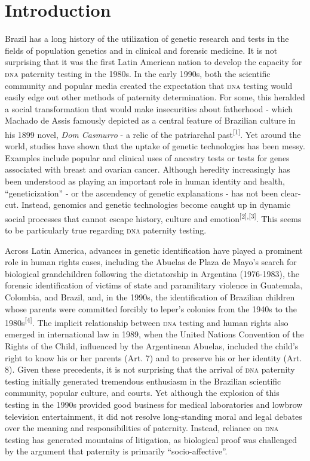 \documentclass{article}
\begin{document}
\section{Introduction}

Brazil has a long history of the utilization of genetic research and tests in
the fields of population genetics and in clinical and forensic medicine. It is
not surprising that it was the first Latin American nation to develop the
capacity for \textsc{dna} paternity testing in the 1980s. In the early 1990s, both the
scientific community and popular media created the expectation that \textsc{dna} testing
would easily edge out other methods of paternity determination. For some, this
heralded a social transformation that would make insecurities about fatherhood -
which Machado de Assis famously depicted as a central feature of Brazilian
culture in his 1899 novel, \textit{Dom Casmurro}
- a relic of the patriarchal past\textsuperscript{[}\textsuperscript{1}\textsuperscript{]}. Yet around the world, studies have shown that the uptake of genetic
technologies has been messy. Examples include popular and clinical uses of
ancestry tests or tests for genes associated with breast and ovarian cancer.
Although heredity increasingly has been understood as playing an important role
in human identity and health, “geneticization” - or the ascendency of genetic
explanations - has not been clear-cut. Instead, genomics and genetic
technologies become caught up in dynamic social processes that cannot escape
history, culture and emotion\textsuperscript{[}\textsuperscript{2}\textsuperscript{]}\textsuperscript{,}\textsuperscript{[}\textsuperscript{3}\textsuperscript{]}. This seems to be particularly true regarding \textsc{dna} paternity testing.

Across Latin America, advances in genetic identification have played a prominent
role in human rights cases, including the Abuelas de Plaza de Mayo’s search for
biological grandchildren following the dictatorship in Argentina (1976-1983),
the forensic identification of victims of state and paramilitary violence in
Guatemala, Colombia, and Brazil, and, in the 1990s, the identification of
Brazilian children whose parents were committed forcibly to leper’s colonies
from the 1940s to the 1980s\textsuperscript{[}\textsuperscript{4}\textsuperscript{]}. The implicit relationship between \textsc{dna} testing and human rights also emerged in
international law in 1989, when the United Nations Convention of the Rights of
the Child, influenced by the Argentinean Abuelas, included the child’s right to
know his or her parents (Art. 7) and to preserve his or her identity (Art. 8).
Given these precedents, it is not surprising that the arrival of \textsc{dna} paternity
testing initially generated tremendous enthusiasm in the Brazilian scientific
community, popular culture, and courts. Yet although the explosion of this
testing in the 1990s provided good business for medical laboratories and lowbrow
television entertainment, it did not resolve long-standing moral and legal
debates over the meaning and responsibilities of paternity. Instead, reliance on
\textsc{dna} testing has generated mountains of litigation, as biological proof was
challenged by the argument that paternity is primarily “socio-affective”.
\end{document}
